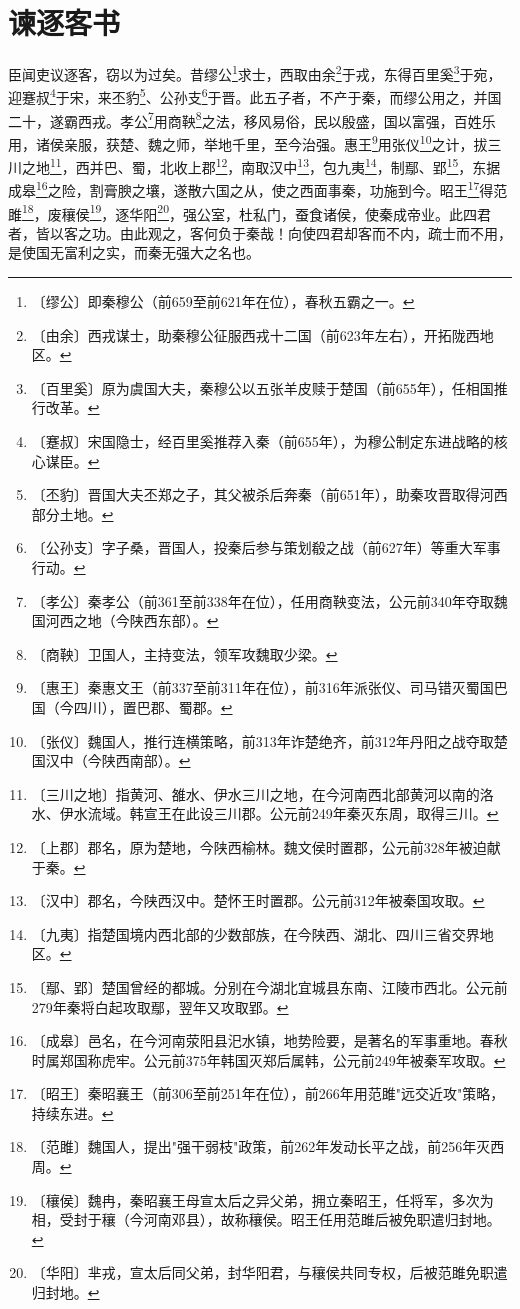 \documentclass[12pt,UTF-8,openany]{ctexbook}
\begin{document}
\chapter{谏逐客书}

\begin{normalsize}
    
    臣闻吏议逐客，窃以为过矣。昔缪公\footnote{〔缪公〕即秦穆公（前659至前621年在位），春秋五霸之一。}求士，西取由余\footnote{〔由余〕西戎谋士，助秦穆公征服西戎十二国（前623年左右），开拓陇西地区。}于戎，东得百里奚\footnote{〔百里奚〕原为虞国大夫，秦穆公以五张羊皮赎于楚国（前655年），任相国推行改革。}于宛，迎蹇叔\footnote{〔蹇叔〕宋国隐士，经百里奚推荐入秦（前655年），为穆公制定东进战略的核心谋臣。}于宋，来丕豹\footnote{〔丕豹〕晋国大夫丕郑之子，其父被杀后奔秦（前651年），助秦攻晋取得河西部分土地。}、公孙支\footnote{〔公孙支〕字子桑，晋国人，投秦后参与策划殽之战（前627年）等重大军事行动。}于晋。此五子者，不产于秦，而缪公用之，并国二十，遂霸西戎。孝公\footnote{〔孝公〕秦孝公（前361至前338年在位），任用商鞅变法，公元前340年夺取魏国河西之地（今陕西东部）。}用商鞅\footnote{〔商鞅〕卫国人，主持变法，领军攻魏取少梁。}之法，移风易俗，民以殷盛，国以富强，百姓乐用，诸侯亲服，获楚、魏之师，举地千里，至今治强。惠王\footnote{〔惠王〕秦惠文王（前337至前311年在位），前316年派张仪、司马错灭蜀国巴国（今四川），置巴郡、蜀郡。}用张仪\footnote{〔张仪〕魏国人，推行连横策略，前313年诈楚绝齐，前312年丹阳之战夺取楚国汉中（今陕西南部）。}之计，拔三川之地\footnote{〔三川之地〕指黄河、雒水、伊水三川之地，在今河南西北部黄河以南的洛水、伊水流域。韩宣王在此设三川郡。公元前249年秦灭东周，取得三川。}，西并巴、蜀，北收上郡\footnote{〔上郡〕郡名，原为楚地，今陕西榆林。魏文侯时置郡，公元前328年被迫献于秦。}，南取汉中\footnote{〔汉中〕郡名，今陕西汉中。楚怀王时置郡。公元前312年被秦国攻取。}，包九夷\footnote{〔九夷〕指楚国境内西北部的少数部族，在今陕西、湖北、四川三省交界地区。}，制鄢、郢\footnote{〔鄢、郢〕楚国曾经的都城。分别在今湖北宜城县东南、江陵市西北。公元前279年秦将白起攻取鄢，翌年又攻取郢。}，东据成皋\footnote{〔成皋〕邑名，在今河南荥阳县汜水镇，地势险要，是著名的军事重地。春秋时属郑国称虎牢。公元前375年韩国灭郑后属韩，公元前249年被秦军攻取。}之险，割膏腴之壤，遂散六国之从，使之西面事秦，功施到今。昭王\footnote{〔昭王〕秦昭襄王（前306至前251年在位），前266年用范雎"远交近攻"策略，持续东进。}得范雎\footnote{〔范雎〕魏国人，提出"强干弱枝"政策，前262年发动长平之战，前256年灭西周。}，废穰侯\footnote{〔穰侯〕魏冉，秦昭襄王母宣太后之异父弟，拥立秦昭王，任将军，多次为相，受封于穰（今河南邓县），故称穰侯。昭王任用范雎后被免职遣归封地。}，逐华阳\footnote{〔华阳〕芈戎，宣太后同父弟，封华阳君，与穰侯共同专权，后被范雎免职遣归封地。}，强公室，杜私门，蚕食诸侯，使秦成帝业。此四君者，皆以客之功。由此观之，客何负于秦哉！向使四君却客而不内，疏士而不用，是使国无富利之实，而秦无强大之名也。
    

\end{normalsize}
\end{document}
